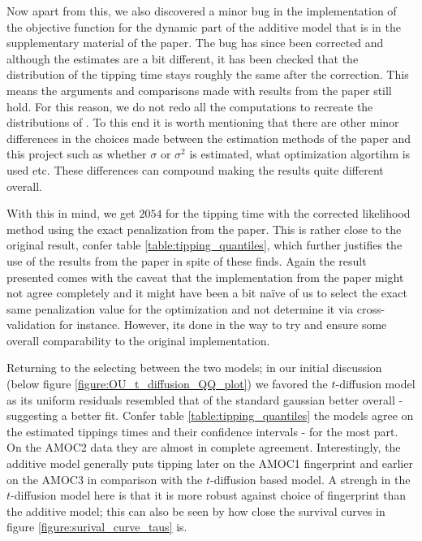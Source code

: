 Now apart from this, we also discovered a minor bug in the implementation of the objective function for the dynamic part of the additive model that is in the supplementary material of the paper. The bug has since been corrected and although the estimates are a bit different, it has been checked that the distribution of the tipping time stays roughly the same after the correction. This means the arguments and comparisons made with results from the paper still hold. For this reason, we do not redo all the computations to recreate the distributions of \cite{Ditlevsen2023}. To this end it is worth mentioning that there are other minor differences in the choices made between the estimation methods of the paper and this project such as whether $\sigma$ or $\sigma^2$ is estimated, what optimization algortihm is used etc. These differences can compound making the results quite different overall. 

With this in mind, we get $2054$ for the tipping time with the corrected likelihood method using the exact penalization from the paper. This is rather close to the original result, confer table \ref{table:tipping_quantiles}, which further justifies the use of the results from the paper in spite of these finds. Again the result presented comes with the caveat that the implementation from the paper might not agree completely and it might have been a bit naïve of us to select the exact same penalization value for the optimization and not determine it via cross-validation for instance. However, its done in the way to try and ensure some overall comparability to the original implementation.

Returning to the selecting between the two models; in our initial discussion (below figure \ref{figure:OU_t_diffusion_QQ_plot}) we favored the $t$-diffusion model as its uniform residuals resembled that of the standard gaussian better overall - suggesting a better fit. Confer table \ref{table:tipping_quantiles} the models agree on the estimated tippings times and their confidence intervals - for the most part. On the AMOC2 data they are almost in complete agreement. Interestingly, the additive model generally puts tipping later on the AMOC1 fingerprint and earlier on the AMOC3 in comparison with the $t$-diffusion based model. A strengh in the $t$-diffusion model here is that it is more robust against choice of fingerprint than the additive model; this can also be seen by how close the survival curves in figure \ref{figure:surival_curve_taus} is.

